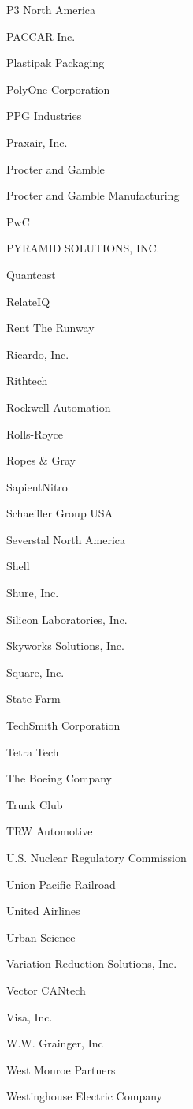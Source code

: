 \documentclass[twoside]{article}
\begin{document}
\begin{center}
\begin{multicols}{5}
\begin{FlushLeft}
\begin{compactitem}
\item P3 North America
\item PACCAR Inc.
\item Plastipak Packaging
\item PolyOne Corporation
\item PPG Industries
\item Praxair, Inc.
\item Procter and Gamble
\item Procter and Gamble Manufacturing
\item PwC
\item PYRAMID SOLUTIONS, INC.
\item Quantcast
\item RelateIQ
\item Rent The Runway
\item Ricardo, Inc.
\item Rithtech
\item Rockwell Automation
\item Rolls-Royce
\item Ropes \& Gray
\item SapientNitro
\item Schaeffler Group USA
\item Severstal North America
\item Shell
\item Shure, Inc.
\item Silicon Laboratories, Inc.
\item Skyworks Solutions, Inc.
\item Square, Inc.
\item State Farm
\item TechSmith Corporation
\item Tetra Tech
\item The Boeing Company
\item Trunk Club
\item TRW Automotive
\item U.S. Nuclear Regulatory Commission
\item Union Pacific Railroad
\item United Airlines
\item Urban Science
\item Variation Reduction Solutions, Inc.
\item Vector CANtech
\item Visa, Inc.
\item W.W. Grainger, Inc
\item West Monroe Partners
\item Westinghouse Electric Company

\end{compactitem}
\end{FlushLeft}
\end{multicols}
\end{center}
\end{document}
